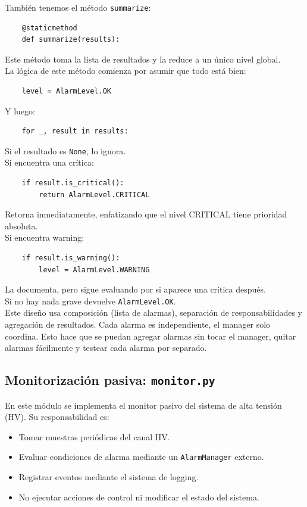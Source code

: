 \documentclass{article}
\begin{document}
También tenemos el método \texttt{summarize}:
\begin{lstlisting}
    @staticmethod
    def summarize(results):
\end{lstlisting}
Este método toma la lista de resultados y la reduce a un único nivel global.\\

La lógica de este método comienza por asumir que todo está bien:
\begin{lstlisting}
    level = AlarmLevel.OK
\end{lstlisting}
Y luego:
\begin{lstlisting}
    for _, result in results:
\end{lstlisting}
Si el resultado es \texttt{None}, lo ignora.\\
Si encuentra una crítica:
\begin{lstlisting}
    if result.is_critical():
        return AlarmLevel.CRITICAL
\end{lstlisting}
Retorna inmediatamente, enfatizando que el nivel CRITICAL tiene prioridad absoluta.\\

Si encuentra warning:
\begin{lstlisting}
    if result.is_warning():
        level = AlarmLevel.WARNING
\end{lstlisting}
La documenta, pero sigue evaluando por si aparece una crítica después.\\
Si no hay nada grave devuelve \texttt{AlarmLevel.OK}.\\

Este diseño usa composición (lista de alarmas), separación de responsabilidades y agregación de resultados. Cada alarma es independiente, el manager solo coordina. Esto hace que se puedan agregar alarmas sin tocar el manager, quitar alarmas fácilmente y testear cada alarma por separado. 

\subsection{Monitorización pasiva: \texttt{monitor.py}}

En este módulo se implementa el monitor pasivo del sistema de alta tensión (HV). 
Su responsabilidad es:

\begin{itemize}
    \item Tomar muestras periódicas del canal HV.
    \item Evaluar condiciones de alarma mediante un \texttt{AlarmManager} externo.
    \item Registrar eventos mediante el sistema de logging.
    \item No ejecutar acciones de control ni modificar el estado del sistema.
\end{itemize}
\end{document}
